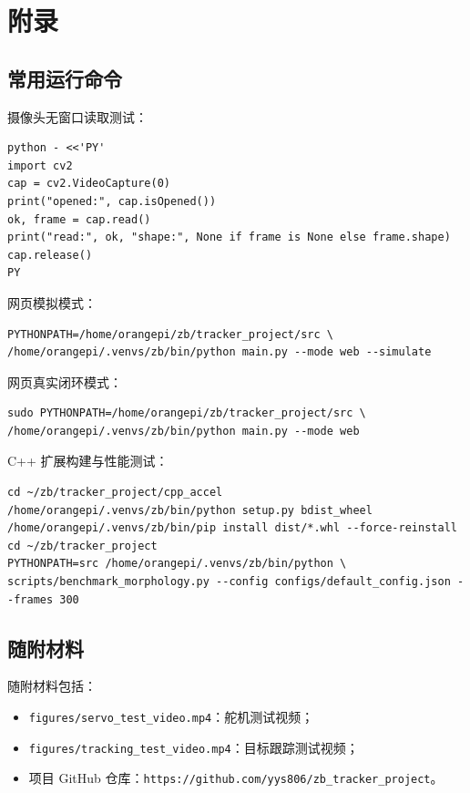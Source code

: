 \chapter{附录}

\section{常用运行命令}

摄像头无窗口读取测试：

\begin{verbatim}
python - <<'PY'
import cv2
cap = cv2.VideoCapture(0)
print("opened:", cap.isOpened())
ok, frame = cap.read()
print("read:", ok, "shape:", None if frame is None else frame.shape)
cap.release()
PY
\end{verbatim}

网页模拟模式：

\begin{verbatim}
PYTHONPATH=/home/orangepi/zb/tracker_project/src \
/home/orangepi/.venvs/zb/bin/python main.py --mode web --simulate
\end{verbatim}

网页真实闭环模式：

\begin{verbatim}
sudo PYTHONPATH=/home/orangepi/zb/tracker_project/src \
/home/orangepi/.venvs/zb/bin/python main.py --mode web
\end{verbatim}

C++ 扩展构建与性能测试：

\begin{verbatim}
cd ~/zb/tracker_project/cpp_accel
/home/orangepi/.venvs/zb/bin/python setup.py bdist_wheel
/home/orangepi/.venvs/zb/bin/pip install dist/*.whl --force-reinstall
cd ~/zb/tracker_project
PYTHONPATH=src /home/orangepi/.venvs/zb/bin/python \
scripts/benchmark_morphology.py --config configs/default_config.json --frames 300
\end{verbatim}

\section{随附材料}

随附材料包括：

\begin{itemize}
  \item \texttt{figures/servo\_test\_video.mp4}：舵机测试视频；
  \item \texttt{figures/tracking\_test\_video.mp4}：目标跟踪测试视频；
  \item 项目 GitHub 仓库：\texttt{https://github.com/yys806/zb\_tracker\_project}。
\end{itemize}

